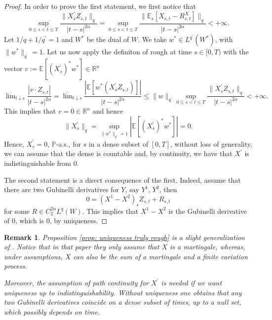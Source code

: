 \documentclass[11pt,a4paper]{article}
\newcommand{\R}{\mathbb{R}}
\theoremstyle{plain}
\newtheorem{rmk}[defn]{Remark}
\begin{document}
\begin{proof}


    In order to prove the first statement, we first notice that
    \begin{equation*}
        \sup_{0\leq s<t\leq T}\frac{\| X^{\prime}_s Z_{s,t}\|_{q}}{|t-s|^{2\alpha}}
        = \sup_{0\leq s<t\leq T}\frac{\|\mathbb{E}_s[X_{s,t} - R^X_{s,t}]\|_q}{|t-s|^{2\alpha}}
        < +\infty.
    \end{equation*}
    Let $1/q + 1/q^{\prime} = 1$ and $W^{\ast}$ be the dual of $W$. We take $w^{\ast} \in L^{q^{\prime}}(W^{\ast})$, with $\|w^{\ast}\|_{q^{\prime}} = 1$.
    Let us now apply the definiton of rough at time $s\in[0,T)$ with the vector $v := \mathbb{E}[(X_s^{\prime})^{\ast}w^{\ast}] \in \R^n$
    \begin{equation*}
        \overline{\lim}_{t\downarrow s} \frac{|v\cdot Z_{s,t}|}{|t-s|^{2\alpha}}
        =
        \overline{\lim}_{t\downarrow s} \frac{|\mathbb{E}[w^{\ast}(X^{\prime}_sZ_{s,t})]|}{|t-s|^{2\alpha}}
        \leq
        \|w\|_{q^{\prime}} 
        \sup_{0\leq s<t\leq T}\frac{\| X^{\prime}_s Z_{s,t}\|_{q}}{|t-s|^{2\alpha}}
        < +\infty.
    \end{equation*}
    This implies that $v = 0 \in \R^{n}$ and hence 
    \begin{equation*}
        \|X^{\prime}_s\|_{q} = \sup_{\|w^{\ast}\|_{q^{\prime}}=1} |\mathbb{E}[(X^{\prime}_s)^{\ast}w^{\ast}]| = 0.
    \end{equation*}
    Hence, $X^{\prime}_s = 0$, $\mathbb{P}$-a.s., for $s$ in a dense subset of $[0,T]$, without loss of generality, we can assume that the dense is countable and, by continuity, we have that $X^{\prime}$ is indistinguishable from $0$.

    The second statement is a direct consequence of the first. Indeed, assume that there are two Gubinelli derivatives for $Y$, say $Y^1$, $Y^2$, then
    \begin{equation*}
        0 = (X^1-X^2)_{s}Z_{s,t} + R_{s,t}
    \end{equation*}
    for some $R \in C^{2\alpha}_2L^q(W)$. This implies that $X^1-X^2$ is the Gubinelli derivative of $0$, which is $0$, by uniqueness.
\end{proof}

\begin{rmk}
    Proposition \ref{prop: uniqueness truly rough} 
    is a slight generalization of \cite[Remark 3.3]{FHL21}.
    Notice that in that paper they only assume that $X$ is a martingale, whereas,
    under assumptions, $X$ can also be the sum of a martingale and a finite variation process.
    
    Moreover, the assumption of path continuity for $X^{\prime}$ is needed if we want uniqueness up to indistinguishability. Without uniqueness one obtains that any two Gubinelli derivatives coincide on a dense subset of times, up to a null set, which possibly depends on time.
   
\end{rmk}
    
\end{document}
